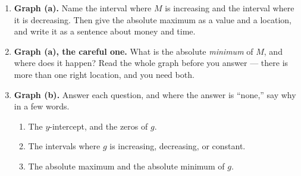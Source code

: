 \documentclass[10pt]{article}
\begin{document}
\begin{tcolorbox}[colback=white, colframe=black!40,
    title=\textbf{Tier A --- Approaching Proficiency},
    fonttitle=\bfseries, arc=2mm, left=3mm, right=3mm, top=2mm, bottom=2mm, breakable]
\begin{enumerate}[leftmargin=1.6em, itemsep=4pt, topsep=2pt]

  \item \textbf{Graph (a).} Name the interval where $M$ is increasing and the interval where it is
        decreasing. Then give the absolute maximum as a value and a location, and write it as a
        sentence about money and time.


  \item \textbf{Graph (a), the careful one.} What is the absolute \emph{minimum} of $M$, and where
        does it happen? Read the whole graph before you answer --- there is more than one right
        location, and you need both.


  \item \textbf{Graph (b).} Answer each question, and where the answer is ``none,'' say why in a
        few words.
        \begin{enumerate}[label=(\alph*), leftmargin=1.6em, itemsep=3pt, topsep=3pt]
          \item The $y$-intercept, and the zeros of $g$.


          \item The intervals where $g$ is increasing, decreasing, or constant.


          \item The absolute maximum and the absolute minimum of $g$.

        \end{enumerate}
\end{enumerate}
\end{tcolorbox}

\vspace{0.10in}
\end{document}

